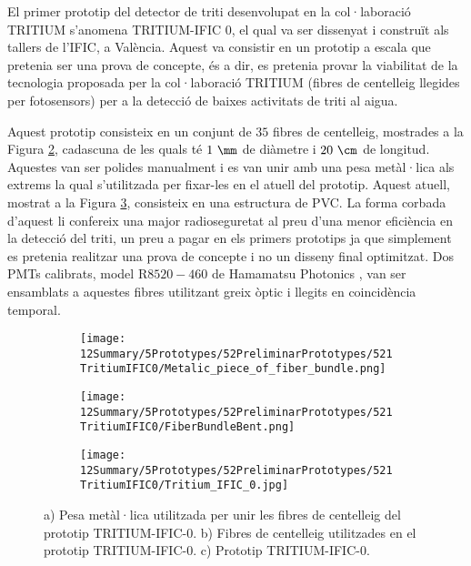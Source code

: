 El primer prototip del detector de triti desenvolupat en la col·laboració TRITIUM s'anomena TRITIUM-IFIC 0, el qual va ser dissenyat i construït als tallers de l'IFIC, a València. Aquest va consistir en un prototip a escala que pretenia ser una prova de concepte, és a dir, es pretenia provar la viabilitat de la tecnologia proposada per la col·laboració TRITIUM (fibres de centelleig llegides per fotosensors) per a la detecció de baixes activitats de triti al aigua.

Aquest prototip consisteix en un conjunt de $35$ fibres de centelleig, mostrades a la Figura \ref{subfig:FibresDobladesTritiumIFIC0}, cadascuna de les quals té $1~\mm$ de diàmetre i $20~\cm$ de longitud. Aquestes van ser polides manualment i es van unir amb una pesa metàl·lica als extrems la qual s'utilitzada per fixar-les en el atuell del prototip. Aquest atuell, mostrat a la Figura \ref{subfig:PrototipTritiumIFIC0}, consisteix en una estructura de PVC. La forma corbada d'aquest li confereix una major radioseguretat al preu d'una menor eficiència en la detecció del triti, un preu a pagar en els primers prototips ja que simplement es pretenia realitzar una prova de concepte i no un disseny final optimitzat. Dos PMTs calibrats, model R$8520-460$ de Hamamatsu Photonics \cite{DataSheetPMTs}, van ser ensamblats a aquestes fibres utilitzant greix òptic \cite{OpticalGrease} i llegits en coincidència temporal.

\begin{figure}
\centering
    \begin{subfigure}[b]{0.5\textwidth}
    \centering
    \texttt{[image: 12Summary/5Prototypes/52PreliminarPrototypes/521TritiumIFIC0/Metalic\_piece\_of\_fiber\_bundle.png]}  
    \caption{\label{subfig:PesaMetalicaFibresTritiumIFIC0}}
    \end{subfigure}
    \hfill
    \begin{subfigure}[b]{0.4\textwidth}
    \centering
    \texttt{[image: 12Summary/5Prototypes/52PreliminarPrototypes/521TritiumIFIC0/FiberBundleBent.png]}  
    \caption{\label{subfig:FibresDobladesTritiumIFIC0}}
    \end{subfigure}
    \hfill
    \begin{subfigure}[b]{0.7\textwidth}
    \centering
    \texttt{[image: 12Summary/5Prototypes/52PreliminarPrototypes/521TritiumIFIC0/Tritium\_IFIC\_0.jpg]}  
    \caption{\label{subfig:PrototipTritiumIFIC0}}
    \end{subfigure}
 \caption{a) Pesa metàl·lica utilitzada per unir les fibres de centelleig del prototip TRITIUM-IFIC-0. b) Fibres de centelleig utilitzades en el prototip TRITIUM-IFIC-0. c) Prototip TRITIUM-IFIC-0.} \label{fig:TritiumIFIC0}
\end{figure}

